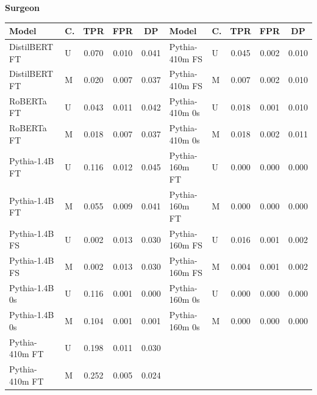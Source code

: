\documentclass[11pt]{article}
\begin{document}
\vspace{4pt}\noindent\textbf{Surgeon}
\begin{center}\scriptsize
\begin{tabular}{llccc|llccc}
\toprule
\textbf{Model} & \textbf{C.} & \textbf{TPR} & \textbf{FPR} & \textbf{DP} & \textbf{Model} & \textbf{C.} & \textbf{TPR} & \textbf{FPR} & \textbf{DP} \\
\midrule
DistilBERT FT & U & 0.070 & 0.010 & 0.041 & Pythia-410m FS & U & 0.045 & 0.002 & 0.010 \\
DistilBERT FT & M & 0.020 & 0.007 & 0.037 & Pythia-410m FS & M & 0.007 & 0.002 & 0.010 \\
RoBERTa FT & U & 0.043 & 0.011 & 0.042 & Pythia-410m 0s & U & 0.018 & 0.001 & 0.010 \\
RoBERTa FT & M & 0.018 & 0.007 & 0.037 & Pythia-410m 0s & M & 0.018 & 0.002 & 0.011 \\
Pythia-1.4B FT & U & 0.116 & 0.012 & 0.045 & Pythia-160m FT & U & 0.000 & 0.000 & 0.000 \\
Pythia-1.4B FT & M & 0.055 & 0.009 & 0.041 & Pythia-160m FT & M & 0.000 & 0.000 & 0.000 \\
Pythia-1.4B FS & U & 0.002 & 0.013 & 0.030 & Pythia-160m FS & U & 0.016 & 0.001 & 0.002 \\
Pythia-1.4B FS & M & 0.002 & 0.013 & 0.030 & Pythia-160m FS & M & 0.004 & 0.001 & 0.002 \\
Pythia-1.4B 0s & U & 0.116 & 0.001 & 0.000 & Pythia-160m 0s & U & 0.000 & 0.000 & 0.000 \\
Pythia-1.4B 0s & M & 0.104 & 0.001 & 0.001 & Pythia-160m 0s & M & 0.000 & 0.000 & 0.000 \\
Pythia-410m FT & U & 0.198 & 0.011 & 0.030 & & & & & \\
Pythia-410m FT & M & 0.252 & 0.005 & 0.024 & & & & & \\
\bottomrule
\end{tabular}
\end{center}
\end{document}

